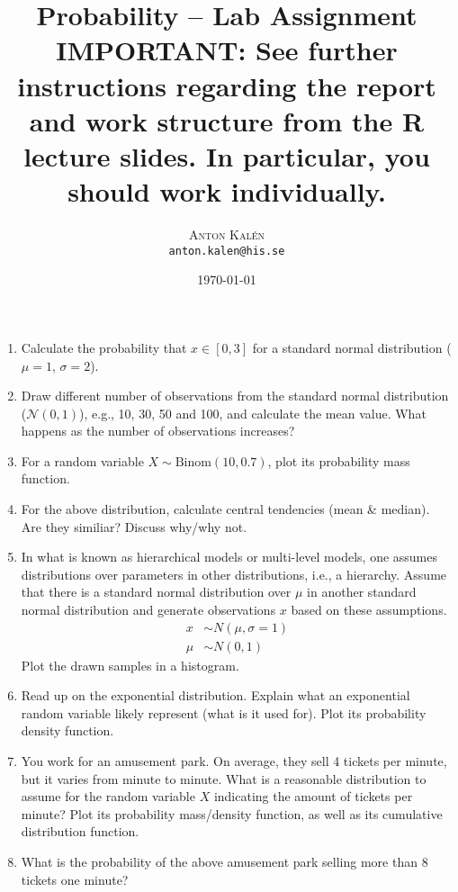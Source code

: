 \documentclass{article}
\author{
        \large
        \textsc{Anton Kalén} \\
        \texttt{anton.kalen@his.se}
}
\title{Probability -- Lab Assignment
{\large {\bf IMPORTANT:} See further instructions regarding the report and work structure from the R lecture slides. In particular, you should work  individually.}           
\\[1cm]}
\date{\today}
\begin{document}
\maketitle
\thispagestyle{empty}   
\begin{enumerate}
	\item Calculate the probability that $x \in [0, 3]$ for a standard 
		normal distribution ($\mu = 1$, $\sigma = 2$).	
	\item Draw different number of observations from the standard normal 
		distribution ($\mathcal{N}(0,1)$), e.g., 10, 30, 50 and 100, and calculate the mean value.
		What happens as the number of observations increases?
	\item For a random variable $X \sim \text{Binom}(10, 0.7)$, plot its probability mass function.
	\item For the above distribution, calculate central tendencies (mean \& median). Are they similiar? Discuss why/why not.
	\item In what is known as hierarchical models or multi-level models, one assumes distributions over parameters in
		other distributions, i.e., a hierarchy. Assume that there is a 
		standard normal distribution over $\mu$ in another standard normal
		distribution and generate observations $x$ based on these assumptions.
		\begin{equation}
		\begin{split}
			x &\sim N(\mu, \sigma=1)\\
			\mu &\sim N(0,1)
		\end{split}
		\end{equation}
		Plot the drawn samples in a histogram.
	\item Read up on the exponential distribution. Explain what an exponential random variable likely represent (what is it used for). Plot its probability density function.
	\item You work for an amusement park. On average, they sell 4 tickets per minute, but it varies from minute to minute. What is a reasonable distribution to assume for the random variable $X$ indicating the amount of tickets per minute? Plot its probability mass/density function, as well as its cumulative distribution function.
	\item What is the probability of the above amusement park selling more than 8 tickets one minute?
\end{enumerate}
\end{document}
